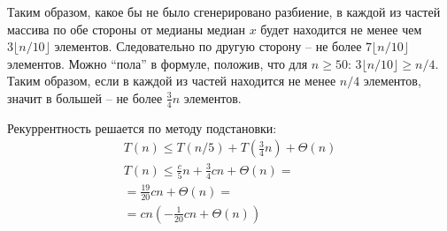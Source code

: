 \documentclass[11pt]{article}
\begin{document}
Таким образом, какое бы не было сгенерировано разбиение, в каждой из частей массива по обе стороны от медианы медиан $x$ будет находится не менее чем $3 \lfloor n/10 \rfloor$ элементов. Следовательно по другую сторону -- не более $7 \lfloor n/10 \rfloor$ элементов. Можно ``пола'' в формуле, положив, что для $n \geqslant 50$: $3 \lfloor n/10 \rfloor \geqslant n/4$. Таким образом, если в каждой из частей находится не менее $n/4$ элементов, значит в большей -- не более $\frac{3}{4}n$ элементов.

Рекуррентность решается по методу подстановки:
\begin{align*}
  T(n) \leqslant T(n/5) + T(\frac{3}{4}n) + \Theta(n) \\
  T(n) \leqslant \frac{c}{5}n + \frac{3}{4}cn + \Theta(n) = \\
  = \frac{19}{20}cn + \Theta(n) = \\
  = cn (-\frac{1}{20}cn + \Theta(n))
\end{align*}
\end{document}
